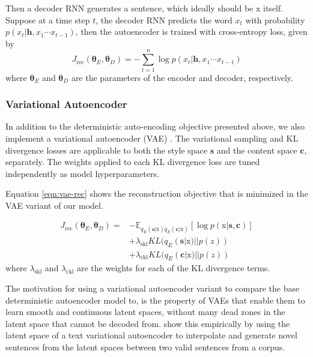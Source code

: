 \documentclass[11pt,a4paper]{article}
\newcommand{\rmx}{\mathrm x}
\newcommand{\loss}[1]{J_\text{#1}}
\begin{document}
Then a decoder RNN generates a sentence, which ideally should be $\rmx$ itself. Suppose at a time step $t$, the decoder RNN predicts the word $x_t$ with probability $p(x_t|\bm h, x_1\cdots x_{t-1})$, then the autoencoder is trained with cross-entropy loss, given by
\begin{equation}
	\loss{rec}(\bm\theta_E,\bm\theta_D)= -\sum_{t=1}^n \log p(x_t|\bm h, x_1\cdots x_{t-1})
\end{equation}
where $\bm\theta_E$ and $\bm\theta_D$ are the parameters of the encoder and decoder, respectively.

\subsubsection{Variational Autoencoder}

In addition to the deterministic auto-encoding objective presented above, we also implement a variational autoencoder (VAE) \cite{kingma2013auto}. The variational sampling and KL divergence losses are applicable to both the style space $\bm s$ and the content space $\bm c$, separately. The weights applied to each KL divergence loss are tuned independently as model hyperparameters.

Equation \ref{eqn:vae-rec} shows the reconstruction objective that is minimized in the VAE variant of our model.

\begin{align} \label{eqn:vae-rec}
	\loss{rec}(\bm\theta_E, \bm\theta_D) = \nonumber
	 & - \mathbb{E}_{q_{E}(\bm s|\rmx) q_{E}(\bm c|\rmx)} [\log p(\rmx|\bm s, \bm c)] \nonumber \\
	 & + \lambda_{\text{skl}} KL(q_{E}(\bm s|\rmx)||p(z)) \nonumber                             \\
	 & + \lambda_{\text{ckl}} KL(q_{E}(\bm c|\rmx)||p(z))
\end{align}
where $\lambda_{\text{skl}}$ and $\lambda_{\text{ckl}}$ are the weights for each of the KL divergence terms.

The motivation for using a variational autoencoder variant to compare the base deterministic autoencoder model to, is the property of VAEs that enable them to learn smooth and continuous latent spaces, without many dead zones in the latent space that cannot be decoded from. \citet{bowman2016generating} show this empirically by using the latent space of a text variational autoencoder to interpolate and generate novel sentences from the latent spaces between two valid sentences from a corpus.
\end{document}
